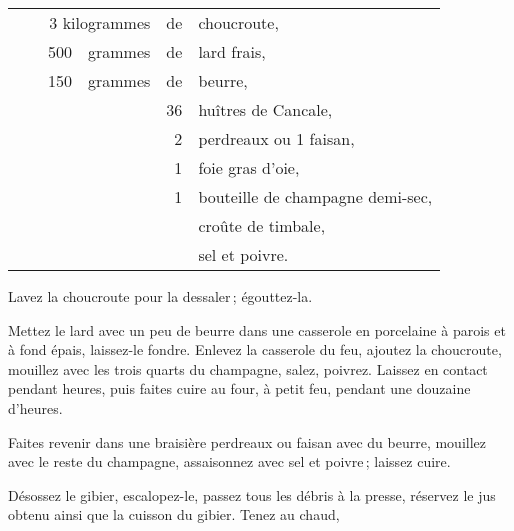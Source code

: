 \footnotesize
\begin{longtable}{rrrrrp{18em}}
  & \multicolumn{3}{r}{3 kilogrammes} & de & choucroute,                                                  \\
  & \hspace{2em} & 500 & grammes & de & lard frais,                                                       \\
  & \hspace{2em} & 150 & grammes & de & beurre,                                                           \\
  & \hspace{2em} &     &         & 36 & huîtres de Cancale,                                               \\
  & \hspace{2em} &     &         &  2 & perdreaux ou 1 faisan,                                            \\
  & \hspace{2em} &     &         &  1 & foie gras d'oie,                                                  \\
  & \hspace{2em} &     &         &  1 & bouteille de champagne demi-sec,                                  \\
  & \hspace{2em} &     &         &    & croûte de timbale,                                                \\
  & \hspace{2em} &     &         &    & sel et poivre.                                                    \\
\end{longtable}
\normalsize

Lavez la choucroute pour la dessaler ; égouttez-la.

Mettez le lard avec un peu de beurre dans une casserole en porcelaine à parois
et à fond épais, laissez-le fondre. Enlevez la casserole du feu, ajoutez la
choucroute, mouillez avec les trois quarts du champagne, salez, poivrez.
Laissez en contact pendant {\mmm} heures, puis faites cuire au four,
à petit feu, pendant une douzaine d'heures.

Faites revenir dans une braisière perdreaux ou faisan avec du beurre, mouillez
avec le reste du champagne, assaisonnez avec sel et poivre ; laissez cuire.

Désossez le gibier, escalopez-le, passez tous les débris à la presse, réservez
le jus obtenu ainsi que la cuisson du gibier. Tenez au chaud,

